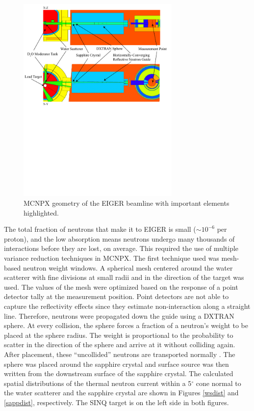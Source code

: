 \documentclass[a4paper,
              ]{jacow}
\begin{document}
\begin{figure}[!htb]
   \centering
   \includegraphics*[trim = 2mm 130mm 5mm 2mm, width=80mm]{graphics/geom.pdf}
   \caption{MCNPX geometry of the EIGER beamline with important elements highlighted.}
   \label{geom}
\end{figure}

The total fraction of neutrons that make it to EIGER is small ($\sim 10^{-6}$ per proton), and the low absorption means neutrons undergo many thousands of interactions before they are lost, on average.  This required the use of multiple variance reduction techniques in MCNPX.  The first technique used was mesh-based neutron weight windows.  A spherical mesh centered around the water scatterer with fine divisions at small radii and in the direction of the target was used.  The values of the mesh were optimized based on the response of a point detector tally at the measurement position.  Point detectors are not able to capture the reflectivity effects since they estimate non-interaction along a straight line.  Therefore, neutrons were propagated down the guide using a DXTRAN sphere.  At every collision, the sphere forces a fraction of a neutron's weight to be placed at the sphere radius.  The weight is proportional to the probability to scatter in the direction of the sphere and arrive at it without colliding again.  After placement, these ``uncollided'' neutrons are transported normally \cite{mcnpx270}.  The sphere was placed around the sapphire crystal and surface source was then written from the downstream surface of the sapphire crystal.  The calculated spatial distributions of the thermal neutron current within a 5$^\circ$ cone normal to the water scatterer and the sapphire crystal are shown in Figures \ref{wsdist} and \ref{sappdist}, respectively.  The SINQ target is on the left side in both figures.
\end{document}
